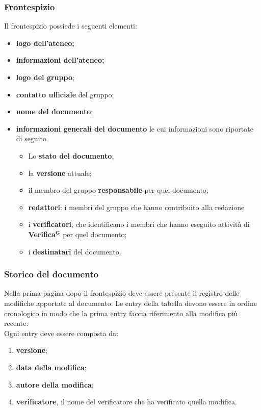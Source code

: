 \documentclass[a4paper,12pt]{article}
\newcommand{\term}[1]{\textbf{#1}$^\mathbf{G}$}
\begin{document}
\subsubsection*{Frontespizio}
Il frontespizio possiede i seguenti elementi:
\begin{itemize}
    \item \textbf{logo dell'ateneo;}
    \item \textbf{informazioni dell'ateneo;}
    \item \textbf{logo del gruppo};
    \item \textbf{contatto ufficiale} del gruppo;
    \item \textbf{nome del documento};
    \item \textbf{informazioni generali del documento} le cui informazioni sono riportate di seguito.
    \begin{itemize}
        \item Lo \textbf{stato del documento};
        \item la \textbf{versione} attuale;
        \item il membro del gruppo \textbf{responsabile} per quel documento;
        \item \textbf{redattori}: i membri del gruppo che hanno contribuito alla redazione 
        \item i \textbf{verificatori}, che identificano i membri che hanno eseguito attività di \term{Verifica} per quel documento; 
        \item i \textbf{destinatari} del documento.
    \end{itemize}
\end{itemize}

\subsubsection*{Storico del documento}
Nella prima pagina dopo il frontespizio deve essere presente il registro delle modifiche apportate al documento. Le entry della tabella devono essere in ordine cronologico in modo che la prima entry faccia riferimento alla modifica più recente.
\\Ogni entry deve essere composta da:
\begin{enumerate}
    \item \textbf{versione};
    \item \textbf{data della modifica};
    \item \textbf{autore della modifica};
    \item \textbf{verificatore}, il nome del verificatore che ha verificato quella modifica.
\end{enumerate}
\end{document}
